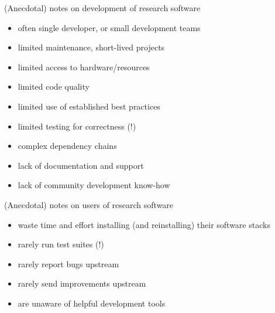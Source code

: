 \begin{frame}[c]{(Anecdotal) notes on development of research software}
	\begin{itemize}
		\item often \alert{single developer}, or small development teams
		\item limited \alert{maintenance, short-lived projects}
		\item limited \alert{access to hardware/resources}
		\item limited \alert{code quality}
		\item limited \alert{use of established best practices}
		\item limited \alert{testing for correctness (!)}
		\item \alert{complex dependency chains}
		\item lack of \alert{documentation and support}
		\item lack of \alert{community development know-how}
	\end{itemize}
\end{frame}

\begin{frame}[c]{(Anecdotal) notes on users of research software}
	\begin{itemize}
		\item \alert{waste time and effort} installing (and reinstalling) their software stacks
		\item \alert{rarely run test suites (!)}
		\item \alert{rarely report bugs} upstream
		\item \alert{rarely send improvements} upstream
		\item are \alert{unaware of helpful development tools}
	\end{itemize}
\end{frame}


